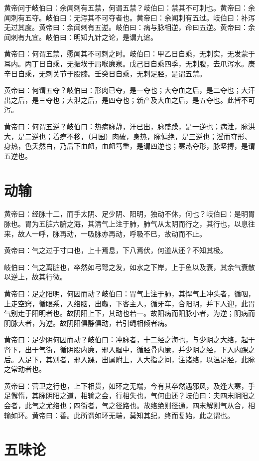 \documentclass[12pt,UTF8]{ctexbook}
\begin{document}
	黄帝问于岐伯曰：余闻刺有五禁，何谓五禁？岐伯曰：禁其不可刺也。黄帝曰：余闻刺有五夺。岐伯曰：无泻其不可夺者也。黄帝曰：余闻刺有五过。岐伯曰：补泻无过其度。黄帝曰：余闻刺有五逆。岐伯曰：病与脉相逆，命曰五逆。黄帝曰：余闻刺有九宜。岐伯曰：明知九针之论，是谓九谊。
	
	黄帝曰：何谓五禁，愿闻其不可刺之时。岐伯曰：甲乙日自乘，无刺实，无发蒙于耳内。丙丁日自乘，无振埃于肩喉廉泉。戊己日自乘四季，无刺腹，去爪泻水。庚辛日自乘，无刺关节于股膝。壬癸日自乘，无刺足胫，是谓五禁。
	
	黄帝曰：何谓五夺？岐伯曰：形肉已夺，是一夺也；大夺血之后，是二夺也；大汗出之后，是三夺也；大泄之后，是四夺也；新产及大血之后，是五夺也。此皆不可泻。
	
	黄帝曰：何谓五逆？岐伯曰：热病脉静，汗已出，脉盛躁，是一逆也；病泄，脉洪大，是二逆也；着痹不移，（月囷）肉破，身热，脉偏绝，是三逆也；淫而夺形、身热，色夭然白，乃后下血衄，血衄笃重，是谓四逆也；寒热夺形，脉坚搏，是谓五逆也。
	\chapter{动输}
	
	黄帝曰：经脉十二，而手太阴、足少阴、阳明，独动不休，何也？岐伯曰：是明胃脉也。胃为五脏六腑之海，其清气上注于肺，肺气从太阴而行之，其行也，以息往来，故人一呼，脉再动，一吸脉亦再动，呼吸不已，故动而不止。
	
	黄帝曰：气之过于寸口也，上十焉息，下八焉伏，何道从还？不知其极。
	
	岐伯曰：气之离脏也，卒然如弓弩之发，如水之下岸，上于鱼以及衰，其余气衰散以逆上，故其行微。
	
	黄帝曰：足之阳明，何因而动？岐伯曰：胃气上注于肺，其悍气上冲头者，循咽，上走空窍，循眼系，入络脑，出顑，下客主人，循牙车，合阳明，并下人迎，此胃气别走于阳明者也。故阴阳上下，其动也若一。故阳病而阳脉小者，为逆；阴病而阴脉大者，为逆。故阴阳俱静俱动，若引绳相倾者病。
	
	黄帝曰：足少阴何因而动？岐伯曰：冲脉者，十二经之海也，与少阴之大络，起于肾下，出于气街，循阴股内廉，邪入腘中，循胫骨内廉，并少阴之经，下入内踝之后。入足下，其别者，邪入踝，出属附上，入大指之间，注诸络，以温足胫，此脉之常动者也。
	
	黄帝曰：营卫之行也，上下相贯，如环之无端，今有其卒然遇邪风，及逢大寒，手足懈惰，其脉阴阳之道，相输之会，行相失也，气何由还？岐伯曰：夫四末阴阳之会者，此气之尤络也；四街者，气之径路也。故络绝则径通，四末解则气从合，相输如环。黄帝曰：善。此所谓如环无端，莫知其纪，终而复始，此之谓也。
	
\chapter{五味论}
\end{document}
